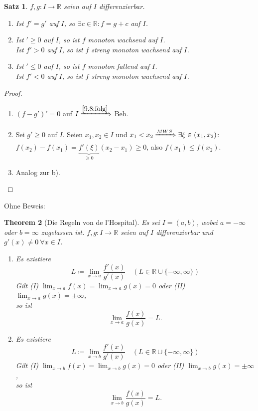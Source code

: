 \documentclass[12pt]{extreport} %
\newcommand{\R}{\mathbb{R}}
\theoremstyle{named}
\newtheorem{unnamedtheorem}{Theorem} \counterwithin{unnamedtheorem}{chapter}
\theoremstyle{dotless}
\newtheorem{satz}[unnamedtheorem]{Satz}
\begin{document}
\begin{satz} \label{9.10:satz}
	$f, g \colon I \rightarrow \R$ seien auf $I$ differenzierbar.
	\begin{enumerate}
		\item Ist $f' = g'$ auf $I$, so $\exists c \in \R: f = g + c$ auf $I$.
		\item Ist $' \geq 0$ auf $I$, so ist $f$ monoton wachsend auf $I$. \\
				Ist $f' > 0$ auf $I$, so ist $f$ streng monoton wachsend auf $I$.
		\item Ist $' \leq 0$ auf $I$, so ist $f$ monoton fallend auf $I$. \\
				Ist $f' < 0$ auf $I$, so ist $f$ streng monoton wachsend auf $I$.
	\end{enumerate}
\end{satz}

\begin{proof}  ~\
	\begin{enumerate}
		\item $(f - g')' = 0$ auf $I \xRightarrow[]{\ref{9.8:folg}}$ Beh.
		\item Sei $g' \geq 0$ auf $I$. Seien $x_{1}, x_{2} \in I$ und $x_{1} < x_{2} \xRightarrow[]{MWS} \exists \xi \in (x_{1}, x_{2})$: $f(x_{2}) - f(x_{1}) = \underbrace{f'(\xi)}_{\geq 0} (x_{2} - x_{1}) \geq 0$, also $f(x_{1}) \leq f(x_{2})$.
		\item Analog zur b).
	\end{enumerate}
\end{proof}

Ohne Beweis:
\begin{unnamedtheorem}[Die Regeln von de l'Hospital] \label{9.11:prop:lHopital}
	Es sei $I = (a, b)$, wobei $a = -\infty$ oder $b = \infty$ zugelassen ist. $f, g \colon I \rightarrow \R$ seien auf $I$ differenzierbar und $g'(x) \neq 0 ~\forall x \in I$. 
	\begin{enumerate}
		\item Es existiere
	$$ L \coloneqq \lim_{x \rightarrow a} \frac{f'(x)}{g'(x)} \quad  (L \in \R \cup \{ - \infty, \infty \}) $$
	Gilt (I) $\lim_{x \rightarrow a} f(x) = \lim_{x \rightarrow a} g(x) = 0$ oder (II) $\lim_{x \rightarrow a} g(x) = \pm \infty$, \\
	so ist 
	$$ \lim_{x \rightarrow a} \frac{f(x)}{g(x)} = L. $$
		\item Es existiere
	$$ L \coloneqq \lim_{x \rightarrow b} \frac{f'(x)}{g'(x)} \quad  (L \in \R \cup \{ - \infty, \infty \}) $$
	Gilt (I) $\lim_{x \rightarrow b} f(x) = \lim_{x \rightarrow b} g(x) = 0$ oder (II) $\lim_{x \rightarrow b} g(x) = \pm \infty$, \\
	so ist 
	$$ \lim_{x \rightarrow b} \frac{f(x)}{g(x)} = L. $$
	\end{enumerate}
	
\end{unnamedtheorem}
\end{document}
